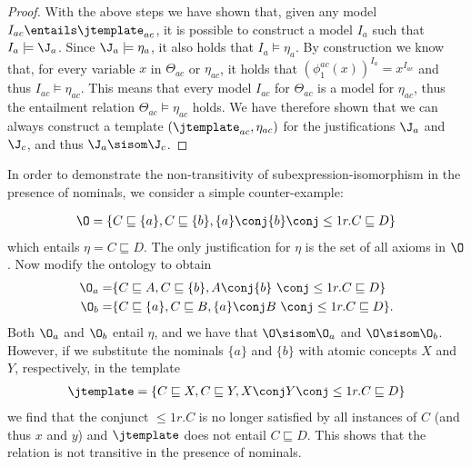 \begin{proof}
With the above steps we have shown that, given any model $I_{ac} \entails \jtemplate_{ac}$, it is possible to construct a model $I_{a}$ such that $I_{a} \models \J_{a}$. Since $\J_{a} \models \eta_{a}$, it also holds that $I_{a} \models \eta_{a}$. 
By construction we know that, for every variable $x$ in $\Theta_{ac}$ or $\eta_{ac}$, it holds that $(\phi^{ac}_{1}(x))^{I_{a}} = x^{I_{ac}}$ and thus $I_{ac} \models \eta_{ac}$. This means that every model $I_{ac}$ for $\Theta_{ac}$ is a model for $\eta_{ac}$, thus the entailment relation $\Theta_{ac} \models \eta_{ac}$ holds. We have therefore shown that we can always construct a template $(\jtemplate_{ac}, \eta_{ac})$ for the justifications $\J_{a}$ and $\J_{c}$, and thus $\J_{a} \sisom \J_{c}$.
\end{proof}

In order to demonstrate the non-transitivity of subexpression-isomorphism in the presence of nominals, we consider a simple counter-example:

\begin{align*}
\O = \{ C \sqsubseteq \{a\},  C \sqsubseteq \{b\}, \{a\} \conj \{b\} \conj \leq 1 r.C \sqsubseteq D\}
\end{align*}
which entails $\eta = C \sqsubseteq D$. The only justification for $\eta$ is the set of all axioms in $\O$. Now modify the ontology to obtain 
\begin{align*}
\O_{a} = &  \{ C \sqsubseteq A,  C \sqsubseteq \{b\}, A \conj \{b\}~ \conj \leq 1 r.C \sqsubseteq D\}\\
\O_{b} = & \{ C \sqsubseteq \{a\},  C \sqsubseteq B, \{a\} \conj B ~\conj \leq 1 r.C \sqsubseteq D\}.\\
\end{align*}
Both $\O_{a}$ and $\O_{b}$ entail $\eta$, and we have that $\O \sisom \O_{a}$ and $\O \sisom \O_{b}$. However, if we substitute the nominals $\{a\}$ and $\{b\}$ with atomic concepts $X$ and $Y$, respectively, in the template
\begin{align*}
 \jtemplate = \{ C \sqsubseteq X,  C \sqsubseteq Y, X \conj Y \conj \leq 1 r.C \sqsubseteq D\}
 \end{align*}
we find that the conjunct $\leq 1 r.C$ is no longer satisfied by all instances of $C$ (and thus $x$ and $y$) and $\jtemplate$ does not entail $C \sqsubseteq D$. This shows that the relation \sisom is not transitive in the presence of nominals.

